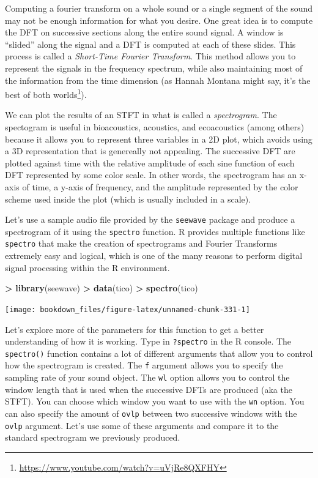 \documentclass[
]{krantz}
\makeatletter
\newenvironment{Shaded}{\begin{snugshade}}{\end{snugshade}}
\newcommand{\KeywordTok}[1]{\textcolor[rgb]{0.27,0.27,0.27}{\textbf{#1}}}
\newcommand{\NormalTok}[1]{#1}
\newcommand{\OperatorTok}[1]{\textcolor[rgb]{0.43,0.43,0.43}{\textbf{#1}}}
\newcommand{\StringTok}[1]{\textcolor[rgb]{0.5,0.5,0.5}{#1}}
\renewcommand{\href}[2]{#2\footnote{\url{#1}}}
\newenvironment{kframe}{%
\medskip{}
\setlength{\fboxsep}{.8em}
 \def\at@end@of@kframe{}%
 \ifinner\ifhmode%
  \def\at@end@of@kframe{\end{minipage}}%
  \begin{minipage}{\columnwidth}%
 \fi\fi%
 \def\FrameCommand##1{\hskip\@totalleftmargin \hskip-\fboxsep
 \colorbox{shadecolor}{##1}\hskip-\fboxsep
     \hskip-\linewidth \hskip-\@totalleftmargin \hskip\columnwidth}%
 \MakeFramed {\advance\hsize-\width
   \@totalleftmargin\z@ \linewidth\hsize
   \@setminipage}}%
 {\par\unskip\endMakeFramed%
 \at@end@of@kframe}
\renewenvironment{Shaded}{\begin{kframe}}{\end{kframe}}
\makeatother
\begin{document}
Computing a fourier transform on a whole sound or a single segment of the sound may not be enough information for what you desire. One great idea is to compute the DFT on successive sections along the entire sound signal. A window is ``slided'' along the signal and a DFT is computed at each of these slides. This process is called a \emph{Short-Time Fourier Transform}. This method allows you to represent the signals in the frequency spectrum, while also maintaining most of the information from the time dimension (as Hannah Montana might say, it's the \href{https://www.youtube.com/watch?v=uVjRe8QXFHY}{best of both worlds}).

We can plot the results of an STFT in what is called a \emph{spectrogram}. The spectogram is useful in bioacoustics, acoustics, and ecoacoustics (among others) because it allows you to represent three variables in a 2D plot, which avoids using a 3D representation that is genereally not appealing. The successive DFT are plotted against time with the relative amplitude of each sine function of each DFT represented by some color scale. In other words, the spectrogram has an x-axis of time, a y-axis of frequency, and the amplitude represented by the color scheme used inside the plot (which is usually included in a scale).

Let's use a sample audio file provided by the \texttt{seewave} package and produce a spectrogram of it using the \texttt{spectro} function. R provides multiple functions like \texttt{spectro} that make the creation of spectrograms and Fourier Transforms extremely easy and logical, which is one of the many reasons to perform digital signal processing within the R environment.

\begin{Shaded}
\begin{Highlighting}[]
\OperatorTok{\textgreater{}}\StringTok{ }\KeywordTok{library}\NormalTok{(seewave)}
\OperatorTok{\textgreater{}}\StringTok{ }\KeywordTok{data}\NormalTok{(tico)}
\OperatorTok{\textgreater{}}\StringTok{ }\KeywordTok{spectro}\NormalTok{(tico)}
\end{Highlighting}
\end{Shaded}

\texttt{[image: bookdown\_files/figure-latex/unnamed-chunk-331-1]}

Let's explore more of the parameters for this function to get a better understanding of how it is working. Type in \texttt{?spectro} in the R console. The \texttt{spectro()} function contains a lot of different arguments that allow you to control how the spectrogram is created. The \texttt{f} argument allows you to specify the sampling rate of your sound object. The \texttt{wl} option allows you to control the window length that is used when the successive DFTs are produced (aka the STFT). You can choose which window you want to use with the \texttt{wn} option. You can also specify the amount of \texttt{ovlp} between two successive windows with the \texttt{ovlp} argument. Let's use some of these arguments and compare it to the standard spectrogram we previously produced.
\end{document}
